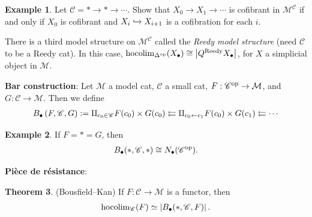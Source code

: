 \documentclass[12pt]{amsart}
\theoremstyle{definition}
\newtheorem{theorem}{Theorem}[section]
\newtheorem{example}[theorem]{Example}
\begin{document}
\begin{example} Let $\mathscr{C} = \ast \to \ast \to \cdots$. Show that $X_0 \to X_1 \to \cdots $ is cofibrant in $\mathcal{M}^{\mathscr{C}}$ if and only if $X_0$ is cofibrant and $X_i \xhookrightarrow{} X_{i+1}$ is a cofibration for each $i$.
\end{example}

There is a third model structure on $\mathcal{M}^{\mathscr{C}}$ called the \textit{Reedy model structure} (need $\mathscr{C}$ to be a Reedy cat). In this case, $\text{hocolim}_{\Delta^{\text{op}}}(X_\bullet) \cong \left| Q^\text{Reedy} X_\bullet \right|$, for $X$ a simplicial object in $\mathcal{M}$.

\textbf{Bar construction}: Let $\mathcal{M}$ a model cat, $\mathscr{C}$ a small cat, $F: \mathscr{C}^{\text{op}} \to \mathcal{M}$, and $G : \mathscr{C} \to \mathcal{M}$. Then we define
\begin{align*}
    B_\bullet \left( F, \mathscr{C}, G \right) := \amalg_{c_0 \in \mathscr{C}} F(c_0) \times G(c_0) \leftleftarrows \amalg_{c_0 \leftarrow c_1} F(c_0) \times G(c_1) \leftleftarrows \cdots 
\end{align*}

\begin{example} If $F = \ast = G$, then
\begin{align*}
    B_\bullet(\ast,\mathscr{C},\ast) \cong N_\bullet(\mathscr{C}^{\text{op}}).
\end{align*}
\end{example}

\textbf{Pi\`ece de r\'esistance}:

\begin{theorem} (Bousfield--Kan) If $F: \mathscr{C} \to \mathcal{M}$ is a functor, then
\begin{align*}
    \text{hocolim}_\mathscr{C}(F) \simeq \left| B_\bullet(\ast,\mathscr{C},F) \right|.
\end{align*}
\end{theorem}


\newpage

{}
\end{document}
